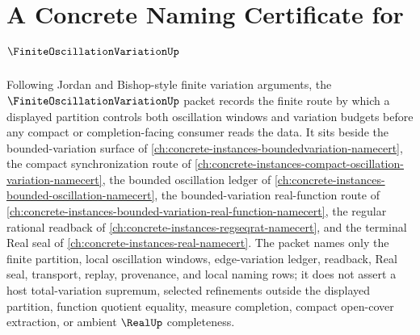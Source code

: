 \chapter{A Concrete Naming Certificate for $\FiniteOscillationVariationUp$}
\label{ch:concrete-instances-finite-oscillation-variation-namecert}

Following Jordan and Bishop-style finite variation arguments, the $\FiniteOscillationVariationUp$ packet records the finite route by which a displayed partition controls both oscillation windows and variation budgets before any compact or completion-facing consumer reads the data. It sits beside the bounded-variation surface of \autoref{ch:concrete-instances-boundedvariation-namecert}, the compact synchronization route of \autoref{ch:concrete-instances-compact-oscillation-variation-namecert}, the bounded oscillation ledger of \autoref{ch:concrete-instances-bounded-oscillation-namecert}, the bounded-variation real-function route of \autoref{ch:concrete-instances-bounded-variation-real-function-namecert}, the regular rational readback of \autoref{ch:concrete-instances-regseqrat-namecert}, and the terminal Real seal of \autoref{ch:concrete-instances-real-namecert}. The packet names only the finite partition, local oscillation windows, edge-variation ledger, readback, Real seal, transport, replay, provenance, and local naming rows; it does not assert a host total-variation supremum, selected refinements outside the displayed partition, function quotient equality, measure completion, compact open-cover extraction, or ambient $\RealUp$ completeness.

